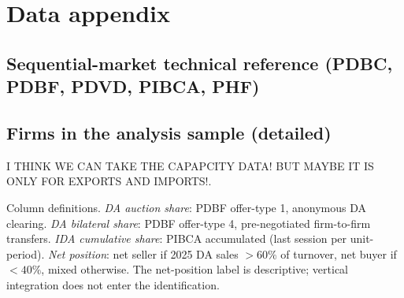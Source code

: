 \documentclass[11pt,a4paper]{article}
\begin{document}
% 
%
%
%


\section{Data appendix}\label{app:data}

\subsection{Sequential-market technical reference (PDBC, PDBF, PDVD, PIBCA, PHF)}

\subsection{Firms in the analysis sample (detailed)}\label{app:firms}

I THINK WE CAN TAKE THE CAPAPCITY DATA! BUT MAYBE IT IS ONLY FOR EXPORTS AND IMPORTS!.

Column definitions. \textit{DA auction share}: PDBF offer-type 1, anonymous DA clearing. \textit{DA bilateral share}: PDBF offer-type 4, pre-negotiated firm-to-firm transfers. \textit{IDA cumulative share}: PIBCA accumulated (last session per unit-period). \textit{Net position}: net seller if 2025 DA sales $>60\%$ of turnover, net buyer if $<40\%$, mixed otherwise. The net-position label is descriptive; vertical integration does not enter the identification.
\end{document}

